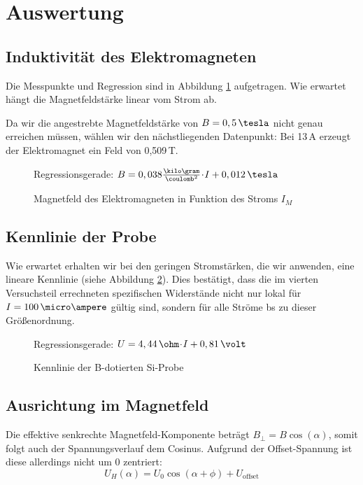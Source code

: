 \newpage
\section{Auswertung}

\subsection{Induktivität des Elektromagneten}
Die Messpunkte und Regression sind in Abbildung \ref{fig:plot_B} aufgetragen. Wie erwartet hängt die Magnetfeldstärke linear vom Strom ab.

Da wir die angestrebte Magnetfeldstärke von $B = 0,5 \,\tesla$ nicht genau erreichen müssen, wählen wir den nächstliegenden Datenpunkt: Bei 13\,A erzeugt der Elektromagnet ein Feld von 0,509\,T.

\begin{figure}[p]
\centering

\caption{Magnetfeld des Elektromagneten in Funktion des Stroms $I_M$}
\label{fig:plot_B}
\vspace{-0.5ex}
Regressionsgerade: $B = 0,038 \frac{\kilo\gram}{\coulomb^2}  \cdt  I  +  0,012\,\tesla$
\end{figure}

\subsection{Kennlinie der Probe}
Wie erwartet erhalten wir bei den geringen Stromstärken, die wir anwenden, eine lineare Kennlinie (siehe Abbildung \ref{fig:plot_Kenn}). Dies bestätigt, dass die im vierten Versuchsteil errechneten spezifischen Widerstände nicht nur lokal für $I = 100\,\micro\ampere$ gültig sind, sondern für alle Ströme bs zu dieser Größenordnung.

\begin{figure}[p]
\centering

\caption{Kennlinie der \textsf{B}-dotierten \textsf{Si}-Probe}
\label{fig:plot_Kenn}
\vspace{-0.5ex}
Regressionsgerade: $U = 4,44\,\ohm \cdt  I  +  0,81\,\volt$
\end{figure}

\subsection{Ausrichtung im Magnetfeld}
Die effektive senkrechte Magnetfeld-Komponente beträgt $B_\perp = B \cos (\alpha)$, somit folgt auch der Spannungsverlauf dem Cosinus. Aufgrund der Offset-Spannung ist diese allerdings nicht um 0 zentriert:
\begin{equation}
U_H(\alpha) = U_0 \cos (\alpha + \phi) + U_\text{offset}
\end{equation}

